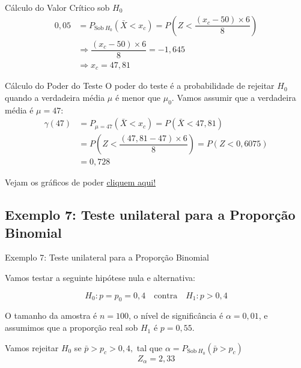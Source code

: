 \documentclass[12pt]{beamer}
\begin{document}
\begin{frame}{}
	\begin{block}{Cálculo do Valor Crítico sob $H_{0}$}
		\justifying
		\begin{align*}
			0,05&=P_{\text{Sob}~H_{0}}(\bar{X}<x_{c})=P(Z<\dfrac{(x_{c}-50)\times6}{8})\\
			&\Rightarrow \dfrac{(x_{c}-50)\times6}{8}=-1,645\\
			&\Rightarrow x_{c}=47,81
		\end{align*}
	\end{block}
	\pause
	\begin{block}{Cálculo do Poder do Teste}
		\justifying
		O poder do teste é a probabilidade de rejeitar $H_0$ quando a verdadeira média $\mu$ é menor que $\mu_0$. Vamos assumir que a verdadeira média é $\mu = 47:$
		\begin{align*}
			\gamma(47)&=P_{\mu=47}(\bar{X}<x_{c})=P(\bar{X}<47,81)\\
			&=P(Z<\dfrac{(47,81-47)\times6}{8})=P(Z<0,6075)\\
			&=0,728
		\end{align*}
	\end{block}
\end{frame}

\begin{frame}{}
	\begin{block}{}
		Vejam os gráficos de poder \href{https://est711.shinyapps.io/FuncaoPoder/}{cliquem aqui!}
	\end{block}
\end{frame}

\subsection{Exemplo 7: Teste unilateral para a Proporção Binomial}
\begin{frame}{Exemplo 7: Teste unilateral para a Proporção Binomial}
	\begin{block}{}
		\justifying
		Vamos testar a seguinte hipótese nula e alternativa:
		
		\[
		H_0: p = p_0 = 0,4 \quad \text{contra} \quad H_1: p > 0,4
		\]
		
		O tamanho da amostra é \(n = 100\), o nível de significância é \(\alpha = 0,01\), e assumimos que a proporção real sob \(H_1\) é \(p = 0,55\).
	\end{block}
	\pause
	\begin{block}{}
		\justifying
		Vamos rejeitar $H_0$ se $\bar{p}>p_{c}>0,4,$ tal que $\alpha=P_{\text{Sob}~H_{0}}(\bar{p}>p_{c})$
		\[
		Z_{\alpha} = 2,33
		\]	
	\end{block}
\end{frame}
\end{document}
